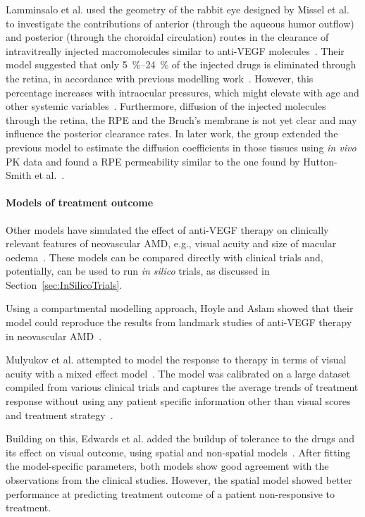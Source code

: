 \documentclass{article}
\begin{document}
Lamminsalo et al. used the geometry of the rabbit eye designed by Missel et al. to investigate the contributions of anterior (through the aqueous humor outflow) and posterior (through the choroidal circulation) routes in the clearance of intravitreally injected macromolecules similar to anti-VEGF molecules~\cite{Lamminsalo_2018}.
Their model suggested that only \SIrange[range-units = single]{5}{24}{\percent} of the injected drugs is eliminated through the retina, in accordance with previous modelling work~\cite{HuttonSmith_2017}.
However, this percentage increases with intraocular pressures, which might elevate with age and other systemic variables~\cite{Armaly_1967,Hashemi_2005}.
Furthermore, diffusion of the injected molecules through the retina, the RPE and the Bruch's membrane is not yet clear and may influence the posterior clearance rates.
In later work, the group extended the previous model to estimate the diffusion coefficients in those tissues using \textit{in vivo} PK data and found a RPE permeability similar to the one found by Hutton-Smith et al.~\cite{Lamminsalo_2020,HuttonSmith_2017}.

\paragraph*{Models of treatment outcome}

Other models have simulated the effect of anti-VEGF therapy on clinically relevant features of neovascular AMD, e.g., visual acuity and size of macular oedema~\cite{Edwards_2020, Hoyle_2017, Mulyukov_2018}.
These models can be compared directly with clinical trials and, potentially, can be used to run \textit{in silico} trials, as discussed in Section~\ref{sec:InSilicoTrials}.

Using a compartmental modelling approach, Hoyle and Aslam showed that their model could reproduce the results from landmark studies of anti-VEGF therapy in neovascular AMD~\cite{Hoyle_2017}.

Mulyukov et al. attempted to model the response to therapy in terms of visual acuity with a mixed effect model~\cite{Mulyukov_2018}.
The model was calibrated on a large dataset compiled from various clinical trials and captures the average trends of treatment response without using any patient specific information other than visual scores and treatment strategy~\cite{Mulyukov_2018}.

Building on this, Edwards et al. added the buildup of tolerance to the drugs and its effect on visual outcome, using spatial and non-spatial models~\cite{Edwards_2020}.
After fitting the model-specific parameters, both models show good agreement with the observations from the clinical studies.
However, the spatial model showed better performance at predicting treatment outcome of a patient non-responsive to treatment.
\end{document}
